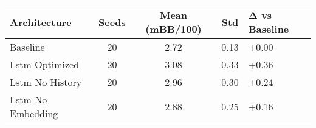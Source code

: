 \begin{tabular}{lcccl}
\toprule
Architecture & Seeds & Mean (mBB/100) & Std & Δ vs Baseline \\
\midrule
Baseline & 20 & 2.72 & 0.13 & +0.00 \\
Lstm Optimized & 20 & 3.08 & 0.33 & +0.36 \\
Lstm No History & 20 & 2.96 & 0.30 & +0.24 \\
Lstm No Embedding & 20 & 2.88 & 0.25 & +0.16 \\
\bottomrule
\end{tabular}
